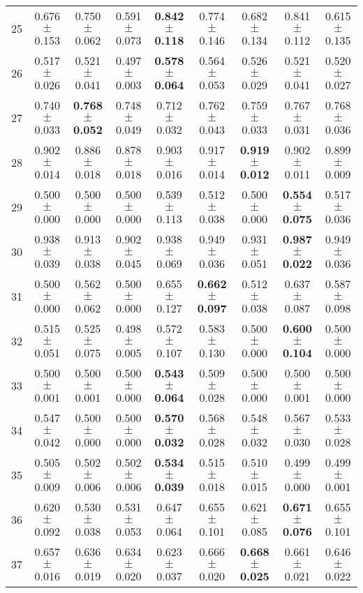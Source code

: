 \begin{table}[!ht]
{\begin{tabular}{r c c c c c c c c}
25 & 0.676 $\pm$ 0.153 & 0.750 $\pm$ 0.062 & 0.591 $\pm$ 0.073 & \textbf{0.842 $\pm$ 0.118} & 0.774 $\pm$ 0.146 & 0.682 $\pm$ 0.134 & 0.841 $\pm$ 0.112 & 0.615 $\pm$ 0.135 \\
26 & 0.517 $\pm$ 0.026 & 0.521 $\pm$ 0.041 & 0.497 $\pm$ 0.003 & \textbf{0.578 $\pm$ 0.064} & 0.564 $\pm$ 0.053 & 0.526 $\pm$ 0.029 & 0.521 $\pm$ 0.041 & 0.520 $\pm$ 0.027 \\
27 & 0.740 $\pm$ 0.033 & \textbf{0.768 $\pm$ 0.052} & 0.748 $\pm$ 0.049 & 0.712 $\pm$ 0.032 & 0.762 $\pm$ 0.043 & 0.759 $\pm$ 0.033 & 0.767 $\pm$ 0.031 & 0.768 $\pm$ 0.036 \\
28 & 0.902 $\pm$ 0.014 & 0.886 $\pm$ 0.018 & 0.878 $\pm$ 0.018 & 0.903 $\pm$ 0.016 & 0.917 $\pm$ 0.014 & \textbf{0.919 $\pm$ 0.012} & 0.902 $\pm$ 0.011 & 0.899 $\pm$ 0.009 \\
29 & 0.500 $\pm$ 0.000 & 0.500 $\pm$ 0.000 & 0.500 $\pm$ 0.000 & 0.539 $\pm$ 0.113 & 0.512 $\pm$ 0.038 & 0.500 $\pm$ 0.000 & \textbf{0.554 $\pm$ 0.075} & 0.517 $\pm$ 0.036 \\
30 & 0.938 $\pm$ 0.039 & 0.913 $\pm$ 0.038 & 0.902 $\pm$ 0.045 & 0.938 $\pm$ 0.069 & 0.949 $\pm$ 0.036 & 0.931 $\pm$ 0.051 & \textbf{0.987 $\pm$ 0.022} & 0.949 $\pm$ 0.036 \\
31 & 0.500 $\pm$ 0.000 & 0.562 $\pm$ 0.062 & 0.500 $\pm$ 0.000 & 0.655 $\pm$ 0.127 & \textbf{0.662 $\pm$ 0.097} & 0.512 $\pm$ 0.038 & 0.637 $\pm$ 0.087 & 0.587 $\pm$ 0.098 \\
32 & 0.515 $\pm$ 0.051 & 0.525 $\pm$ 0.075 & 0.498 $\pm$ 0.005 & 0.572 $\pm$ 0.107 & 0.583 $\pm$ 0.130 & 0.500 $\pm$ 0.000 & \textbf{0.600 $\pm$ 0.104} & 0.500 $\pm$ 0.000 \\
33 & 0.500 $\pm$ 0.001 & 0.500 $\pm$ 0.001 & 0.500 $\pm$ 0.000 & \textbf{0.543 $\pm$ 0.064} & 0.509 $\pm$ 0.028 & 0.500 $\pm$ 0.000 & 0.500 $\pm$ 0.001 & 0.500 $\pm$ 0.000 \\
34 & 0.547 $\pm$ 0.042 & 0.500 $\pm$ 0.000 & 0.500 $\pm$ 0.000 & \textbf{0.570 $\pm$ 0.032} & 0.568 $\pm$ 0.028 & 0.548 $\pm$ 0.032 & 0.567 $\pm$ 0.030 & 0.533 $\pm$ 0.028 \\
35 & 0.505 $\pm$ 0.009 & 0.502 $\pm$ 0.006 & 0.502 $\pm$ 0.006 & \textbf{0.534 $\pm$ 0.039} & 0.515 $\pm$ 0.018 & 0.510 $\pm$ 0.015 & 0.499 $\pm$ 0.000 & 0.499 $\pm$ 0.001 \\
36 & 0.620 $\pm$ 0.092 & 0.530 $\pm$ 0.038 & 0.531 $\pm$ 0.053 & 0.647 $\pm$ 0.064 & 0.655 $\pm$ 0.101 & 0.621 $\pm$ 0.085 & \textbf{0.671 $\pm$ 0.076} & 0.655 $\pm$ 0.101 \\
37 & 0.657 $\pm$ 0.016 & 0.636 $\pm$ 0.019 & 0.634 $\pm$ 0.020 & 0.623 $\pm$ 0.037 & 0.666 $\pm$ 0.020 & \textbf{0.668 $\pm$ 0.025} & 0.661 $\pm$ 0.021 & 0.646 $\pm$ 0.022 \\

\end{tabular}}
\end{table}
